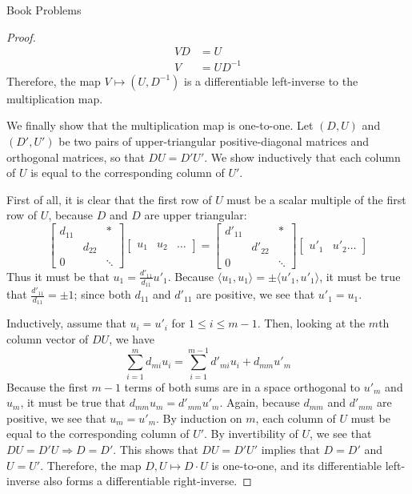 \documentclass[12pt]{article}
\theoremstyle{definition}
\begin{document}
\begin{section}{Book Problems}
\begin{proof}
\begin{align*}
	VD &= U\\
	V &= UD^{-1}
\end{align*}
Therefore, the map $V \mapsto (U, D^{-1})$ is a differentiable left-inverse to the multiplication map.
\par We finally show that the multiplication map is one-to-one. Let $(D, U)$ and $(D', U')$ be two pairs of upper-triangular positive-diagonal matrices and orthogonal matrices, so that $DU = D'U'$. We show inductively that each column of $U$ is equal to the corresponding column of  $U'$.
\par First of all, it is clear that the first row of $U$ must be a scalar multiple of the first row of $U$, because $D$ and $D$ are upper triangular:
\[ \begin{bmatrix}
		d_{11} & & *\\
		 & d_{22} & \\
		0  & & \ddots
	\end{bmatrix} \begin{bmatrix}
		u_1 & u_2 & \dots
	\end{bmatrix} = 
\begin{bmatrix}
		d'_{11} & & *\\
		 & d'_{22} & \\
		0  & & \ddots
	\end{bmatrix} \begin{bmatrix}
		u'_1 & u'_2 \dots 
	\end{bmatrix}
\]
Thus it must be that $u_1 = \frac{d'_{11}}{d_{11}}u'_1$. Because $\langle u_1, u_1\rangle = \pm \langle u'_1, u'_1\rangle$, it must be true that $\frac{d'_{11}}{d_{11}} = \pm 1$; since both $d_{11}$ and $d'_{11}$ are positive, we see that $u'_1 = u_1$.
\par Inductively, assume that $u_i = u'_i$ for $1 \leq i \leq m-1$. Then, looking at the $m$th column vector of $DU$, we have 
\[\sum_{i = 1}^m d_{mi}u_i = \sum_{i=1}^{m-1}d'_{mi}u_i + d_{mm}u'_m\]
Because the first $m-1$ terms of both sums are in a space orthogonal to $u'_m$ and $u_m$, it must be true that $d_{mm} u_m = d'_{mm}u'_m$. Again, because $d_{mm}$ and $d'_{mm}$ are positive, we see that $u_m = u'_m$. By induction on $m$, each column of $U$ must be equal to the corresponding column of $U'$. By invertibility of $U$, we see that $DU = D'U \Rightarrow D = D'$. This shows that $DU = D'U'$ implies that $D = D'$ and $U = U'$.
 Therefore, the map $D, U \mapsto D \cdot U$ is one-to-one, and its differentiable left-inverse also forms a differentiable right-inverse. 

\end{proof}
\end{section}
\end{document}
